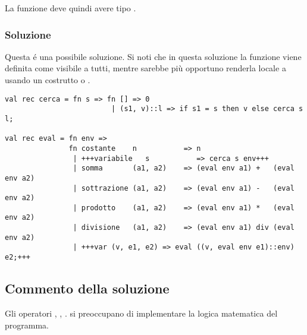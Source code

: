 \medskip
La funzione  deve quindi avere tipo .

\subsubsection{Soluzione}

Questa é una possibile soluzione. %
Si noti che in questa soluzione la funzione  viene definita come visibile a tutti, mentre sarebbe più opportuno renderla locale a  usando un costrutto  o .

\begin{lstlisting}[style = SML, caption = {Definizione della funzione \sml{eval}}]
val rec cerca = fn s => fn [] => 0
						 | (s1, v)::l => if s1 = s then v else cerca s l;

val rec eval = fn env =>
			   fn costante    n           => n
			   	| +++variabile   s           => cerca s env+++
				| somma       (a1, a2)    => (eval env a1) +   (eval env a2)
				| sottrazione (a1, a2)    => (eval env a1) -   (eval env a2)
				| prodotto    (a1, a2)    => (eval env a1) *   (eval env a2)
				| divisione   (a1, a2)    => (eval env a1) div (eval env a2)
				| +++var (v, e1, e2) => eval ((v, eval env e1)::env) e2;+++
\end{lstlisting}

\subsection{Commento della soluzione}

Gli operatori \sml{+}, \sml{-}, \sml{*}.  si preoccupano di implementare la logica matematica del programma.
